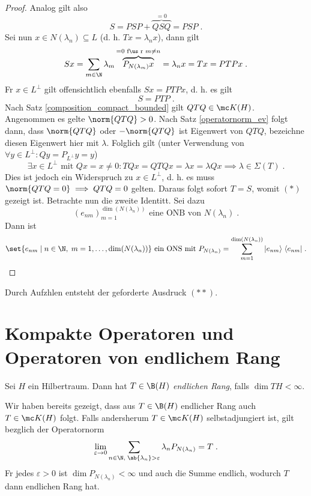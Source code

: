 \begin{theorem}
\begin{proof}
		Analog gilt also 
		\[S = PSP + \overbrace{QSQ}^{ = 0} = PSP\;.\]
		Sei nun \(x \in N(\lambda_n)\subseteq L\) (d. h. \(Tx  = \lambda_n x\)), dann gilt
		\[Sx = \sum_{m\in \N} \lambda_m \overbrace{P_{N(\lambda_m )} x}^{=0 \text{ f\us r } m\neq n} = \lambda_n x = Tx = PTP x\;.\]
		F\us r \(x \in L^\perp\) gilt offensichtlich ebenfalls \(Sx = PTPx\), d. h. es gilt
		\[S = PTP\;.\]
		Nach Satz \ref{composition_compact_bounded} gilt \(QTQ \in \mc K(H)\). Angenommen es gelte \(\norm{QTQ} > 0\). Nach Satz \ref{operatornorm_ev} folgt dann, dass \(\norm{QTQ}\) oder \(-\norm{QTQ}\) ist Eigenwert von \(QTQ\), bezeichne diesen Eigenwert hier mit \(\lambda\). Folglich gilt (unter Verwendung von \(\forall y\in L^\perp: Q y = P_{L^\perp} y = y\))
	\[\exists x \in L^\perp\text{ mit } Qx = x \neq 0: TQ x = QTQ x = \lambda x = \lambda Qx \implies \lambda \in \Sigma(T)\;.\]
	Dies ist jedoch ein Widerspruch zu \(x\in L^\perp\), d. h. es muss \(\norm{QTQ = 0} \implies QTQ = 0\) gelten. Daraus folgt sofort \(T = S\), womit \((*)\) gezeigt ist. Betrachte nun die zweite Identit\as t. Sei dazu
	\[ (e_{nm})_{m=1}^{\dim(N(\lambda_n))} \text{ eine ONB von } N(\lambda_n)\;.\]
	Dann ist 
	\[\set{e_{nm}\;\vert\; n\in\N,\; m = 1,\ldots, \dim(N(\lambda_n))}  \text{ ein ONS mit } P_{N(\lambda_n)} = \sum_{m=1}^{\dim(N(\lambda_n))} \vert e_{nm}\rangle \;\langle e_{nm} \vert\;. \]
	\end{proof}
	Durch Aufz\as hlen entsteht der geforderte Ausdruck \((**)\).
\end{theorem}

\section{Kompakte Operatoren und Operatoren von endlichem Rang}
\begin{definition}
	Sei $H$ ein Hilbertraum. Dann hat \(T\in \B(H)\) \textit{endlichen Rang}, falls \(\dim TH< \infty\).
\end{definition}
\begin{rem}
	Wir haben bereits gezeigt, dass aus \(T \in \B(H)\) endlicher Rang auch \(T\in\mc K(H)\) folgt. Falls andersherum \(T \in \mc K(H)\) selbstadjungiert ist, gilt bez\us glich der Operatornorm
	\[\lim_{\varepsilon\to 0} \sum_{n\in\N,\;\ab{\lambda_n} > \varepsilon} \lambda_n P_{N(\lambda_n)} = T\;.\]
	F\us r jedes \(\varepsilon > 0\) ist \(\dim P_{N(\lambda_n)}<\infty\) und auch die Summe endlich, wodurch $T$ dann endlichen Rang hat.
\end{rem}


